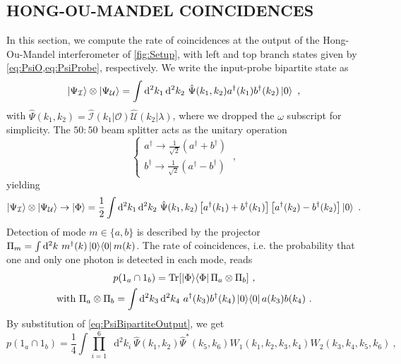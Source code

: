 \documentclass[reprint,
superscriptaddress,
nofootinbib,
aps,
pra,
showkeys
]{revtex4-2}
\newcommand*\dif{\mathop{}\!\mathrm{d}}
\newcommand{\I}{\mathcal{I}}
\newcommand{\U}{\mathcal{U}}
\renewcommand{\O}{\mathcal{O}}
\begin{document}
\begin{widetext}
\section{HONG-OU-MANDEL COINCIDENCES\label{app:Coincidences}}
In this section, we compute the rate of coincidences at the output of the Hong-Ou-Mandel interferometer of \cref{fig:Setup}, with left and top branch states given by \cref{eq:PsiO,eq:PsiProbe}, respectively. We write the input-probe bipartite state as
\begin{equation}
	\ket{\Psi_\I} \otimes \ket{\Psi_\U} = \int \dif^2k_1 \dif^2k_2 \ \hat{\Psi}(k_1,k_2) a^\dagger(k_1) b^\dagger(k_2) \ket{0} \ ,
	\label{eq:PsiBipartite}
\end{equation}
with $\hat{\Psi}(k_1,k_2) = \hat{\I}(k_1 | \O) \hat{\U}(k_2|\lambda)$, where we dropped the $\omega$ subscript for simplicity. The $50\!:\!50$ beam splitter acts as the unitary operation \citep{art:Branczyk}
\begin{equation}
	\begin{cases}
		a^\dagger \to \frac{1}{\sqrt{2}}\left( a^\dagger + b^\dagger \right) \\
		b^\dagger \to \frac{1}{\sqrt{2}}\left( a^\dagger - b^\dagger \right)
	\end{cases} \ ,
\end{equation} 
yielding
\begin{equation}
	\ket{\Psi_\I} \otimes \ket{\Psi_\U} \to \ket{\Phi} = \frac{1}{2} \int \dif^2k_1 \dif^2k_2 \ \hat{\Psi}(k_1,k_2) \left[ a^\dagger(k_1) + b^\dagger(k_1) \right]\left[ a^\dagger(k_2) - b^\dagger(k_2) \right] \ket{0} \ .
	\label{eq:PsiBipartiteOutput}
\end{equation}
Detection of mode $m \in \{a,b\}$ is described by the projector $\Pi_{m} = \int \dif^2k \ m^\dagger(k)\ket{0}\!\bra{0}m(k)$. The rate of coincidences, i.e. the probability that one and only one photon is detected in each mode, reads
\begin{gather}
	 p(1_a \cap 1_b) = \Tr[\ket{\Phi}\!\bra{\Phi}\Pi_a \otimes \Pi_b] \ , \\
	\text{with} \ \Pi_a \otimes \Pi_b = \int \dif^2k_3 \dif^2k_4 \ a^\dagger(k_3) b^\dagger(k_4) \ket{0}\!\bra{0} a(k_3) b(k_4) \ .
\end{gather}
By substitution of \cref{eq:PsiBipartiteOutput}, we get
\begin{equation}
	p(1_a \cap 1_b) = \frac{1}{4}\int \prod_{i=1}^6 \dif^2k_i \ \hat{\Psi}(k_1,k_2) \hat{\Psi}^*(k_5,k_6) W_1(k_1,k_2,k_3,k_4)W_2(k_3,k_4,k_5,k_6) \ , 
	\label{eq:CoincStep}
\end{equation}

\end{widetext}
\end{document}
